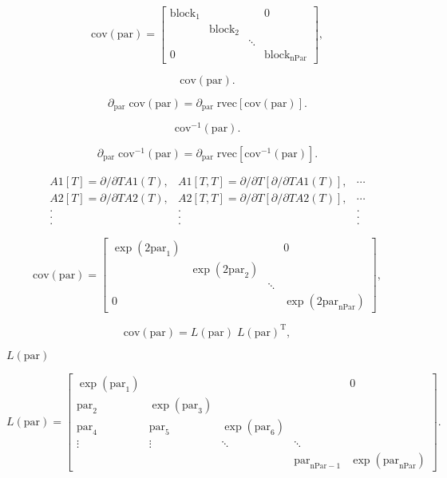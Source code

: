 \documentclass{article}
\begin{document}
\[ \mbox{cov}(\mbox{par}) = \left[ \begin{array}{cccc} \mbox{block}_1 & & & 0 \\ & \mbox{block}_2 & & \\ & & \ddots & \\ 0 & & & \mbox{block}_{\mbox{nPar}} \end{array} \right] , \]
\pagebreak

\[ \mbox{cov}(\mbox{par}) . \]
\pagebreak

\[ \partial_{\mbox{par}} \; \mbox{cov}(\mbox{par}) = \partial_{\mbox{par}} \; \mbox{rvec} \left[ \mbox{cov}(\mbox{par}) \right] . \]
\pagebreak

\[ \mbox{cov}^{-1}(\mbox{par}) . \]
\pagebreak

\[ \partial_{\mbox{par}} \; \mbox{cov}^{-1}(\mbox{par}) = \partial_{\mbox{par}} \; \mbox{rvec} \left[ \mbox{cov}^{-1}(\mbox{par}) \right] . \]
\pagebreak

\[ \begin{array}{ccc} A1[T] = \partial / \partial T A1(T), & A1[T,T] = \partial / \partial T [ \partial / \partial T A1(T) ], & \cdots \\ A2[T] = \partial / \partial T A2(T), & A2[T,T] = \partial / \partial T [ \partial / \partial T A2(T) ], & \cdots \\ . & . & . \\ . & . & . \\ . & . & . \mbox{} \end{array} \]
\pagebreak

\[ \mbox{cov}(\mbox{par}) = \left[ \begin{array}{cccc} \exp(2 \mbox{par}_1) & & & 0 \\ & \exp(2 \mbox{par}_2) & & \\ & & \ddots & \\ 0 & & & \exp(2 \mbox{par}_{\mbox{nPar}}) \end{array} \right] , \]
\pagebreak

\[ \mbox{cov}(\mbox{par}) = L(\mbox{par}) \; L(\mbox{par})^{\mbox{T}} , \]
\pagebreak

$ L(\mbox{par}) $
\pagebreak

\[ L(\mbox{par}) = \left[ \begin{array}{ccccc} \exp(\mbox{par}_1) & & & & 0 \\ \mbox{par}_2 & \exp(\mbox{par}_3) & & & \\ \mbox{par}_4 & \mbox{par}_5 & \exp(\mbox{par}_6) & & \\ \vdots & \vdots & \ddots & \ddots & \\ & & & \mbox{par}_{\mbox{nPar}-1} & \exp(\mbox{par}_{\mbox{nPar}}) \end{array} \right] . \]
\pagebreak
\end{document}
